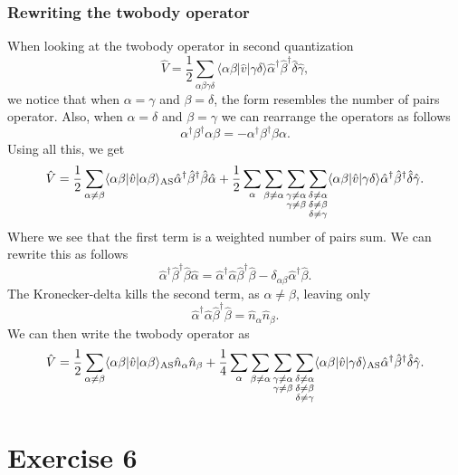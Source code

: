 \documentclass[a4paper, 11pt, notitlepage, english]{article}
\newcommand{\op}[1]{\hat{#1}}
\newcommand{\braopket}[3]{\langle #1 | {#2} | #3 \rangle}
\begin{document}
\subsubsection*{Rewriting the twobody operator}
When looking at the twobody operator in second quantization
$$\op{V} = \frac{1}{2}\sum_{\alpha\beta\gamma\delta}\braopket{\alpha\beta}{\op{v}}{\gamma\delta}\op{\alpha}^\dag\op{\beta}^\dag \op{\delta}\op{\gamma},$$
we notice that when $\alpha=\gamma$ and $\beta=\delta$, the form resembles the number of pairs operator. Also, when $\alpha=\delta$ and $\beta=\gamma$ we can rearrange the operators as follows
$$\alpha^\dagger\beta^\dagger\alpha \beta = -\alpha^\dagger\beta^\dagger \beta\alpha.$$
Using all this, we get
$$\op{V} = \frac{1}{2}\sum_{\alpha \neq \beta} \braopket{\alpha\beta}{\op{v}}{\alpha\beta}_{\rm AS}\op{\alpha}^\dag\op{\beta}^\dag\op{\beta}\op{\alpha} + \frac{1}{2}\sum_{\alpha}\sum_{\beta\neq\alpha}\sum_{\substack{\gamma\neq\alpha \\ \gamma \neq\beta}}\sum_{\substack{\delta\neq\alpha \\\delta\neq\beta\\ \delta \neq \gamma}} \braopket{\alpha\beta}{\op{v}}{\gamma\delta}\op{\alpha}^\dag\op{\beta}^\dag \op{\delta}\op{\gamma} .$$
Where we see that the first term is a weighted number of pairs sum. We can rewrite this as follows
$$\op{\alpha}^\dag\op{\beta}^\dag \op{\beta} \op{\alpha} = \op{\alpha}^\dag \op{\alpha}\op{\beta}^\dag\op{\beta} - \delta_{\alpha\beta}\op{\alpha}^\dag\op{\beta}.$$
The Kronecker-delta kills the second term, as $\alpha\neq\beta$, leaving only
$$\op{\alpha}^\dag\op{\alpha} \op{\beta}^\dag \op{\beta} = \op{n}_\alpha \op{n}_\beta.$$
We can then write the twobody operator as
$$\op{V} = \frac{1}{2}\sum_{\alpha \neq \beta} \braopket{\alpha\beta}{\op{v}}{\alpha\beta}_{\rm AS}\op{n}_\alpha \op{n}_\beta + \frac{1}{4}\sum_{\alpha}\sum_{\beta\neq\alpha}\sum_{\substack{\gamma\neq\alpha \\ \gamma \neq\beta}}\sum_{\substack{\delta\neq\alpha \\\delta\neq\beta\\ \delta \neq \gamma}} \braopket{\alpha\beta}{\op{v}}{\gamma\delta}_{\rm AS}\op{\alpha}^\dag\op{\beta}^\dag \op{\delta}\op{\gamma} .$$

\clearpage

\section*{Exercise 6}
\end{document}
